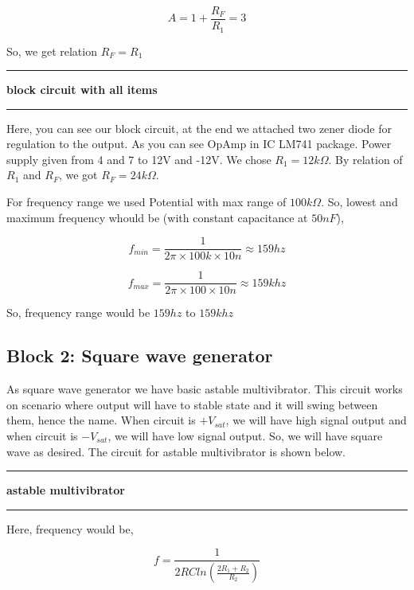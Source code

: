 \documentclass{article}
\begin{document}
\begin{equation}
\label{eq:org4c38dd8}
  A = 1+\frac{R_{F}}{R_{1}} = 3
\end{equation}

So, we get relation \(R_{F}=R_{1}\)


\noindent\rule{\textwidth}{0.5pt}
\textbf{\textbf{block circuit with all items}}

\noindent\rule{\textwidth}{0.5pt}


Here, you can see our block circuit, at the end we attached two zener diode for regulation to the output. As you can see OpAmp in IC LM741 package. Power supply given from  4 and 7 to 12V and -12V. We chose \(R_{1}=12k\Omega\). By relation of \(R_{1}\) and \(R_{F}\), we got \(R_{F}=24k\Omega\).

For frequency range we used Potential with max range of \(100k\Omega\). So, lowest and maximum frequency whould be (with constant capacitance at \(50nF\)),

\begin{equation*}
\label{eq:orgc938ca7}
  f_{min} = \frac{1}{2\pi\times100k\times 10n} \approx 159 hz
\end{equation*}

\begin{equation*}
\label{eq:org9307fe2}
  f_{max} = \frac{1}{2\pi\times100\times 10n} \approx 159k hz
\end{equation*}

So, frequency range would be \(159 hz\) to \(159k hz\)


\subsection{Block 2: Square wave generator}
\label{sec:org81d29d1}

As square wave generator we have basic astable multivibrator. This circuit works on scenario where output will have to stable state and it will swing between them, hence the name. When circuit is \(+V_{sat}\), we will have high signal output and when circuit is \(-V_{sat}\), we will have low signal output. So, we will have square wave as desired. The circuit for astable multivibrator is shown below.

\noindent\rule{\textwidth}{0.5pt}
\textbf{\textbf{astable multivibrator}}

\noindent\rule{\textwidth}{0.5pt}

Here, frequency would be, 

\begin{equation}
\label{eq:orgd806db9}
  f =\frac{1}{2 RC ln(\frac{2R_{1}+R_{2}}{R_{2}})}
\end{equation}
\end{document}
